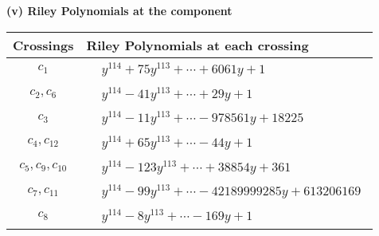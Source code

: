 \documentclass[1p]{elsarticle_modified}
\theoremstyle{definition}
\begin{document}
\flushleft \textbf{(v) Riley Polynomials at the component}\newline \\
\begin{tabular}{m{50pt}|m{274pt}}
Crossings & \hspace{64pt}Riley Polynomials at each crossing \\
\hline $$\begin{aligned}c_{1}\end{aligned}$$&$\begin{aligned}
&y^{114}+75 y^{113}+\cdots+6061 y+1
\end{aligned}$\\
\hline $$\begin{aligned}c_{2},c_{6}\end{aligned}$$&$\begin{aligned}
&y^{114}-41 y^{113}+\cdots+29 y+1
\end{aligned}$\\
\hline $$\begin{aligned}c_{3}\end{aligned}$$&$\begin{aligned}
&y^{114}-11 y^{113}+\cdots-978561 y+18225
\end{aligned}$\\
\hline $$\begin{aligned}c_{4},c_{12}\end{aligned}$$&$\begin{aligned}
&y^{114}+65 y^{113}+\cdots-44 y+1
\end{aligned}$\\
\hline $$\begin{aligned}c_{5},c_{9},c_{10}\end{aligned}$$&$\begin{aligned}
&y^{114}-123 y^{113}+\cdots+38854 y+361
\end{aligned}$\\
\hline $$\begin{aligned}c_{7},c_{11}\end{aligned}$$&$\begin{aligned}
&y^{114}-99 y^{113}+\cdots-42189999285 y+613206169
\end{aligned}$\\
\hline $$\begin{aligned}c_{8}\end{aligned}$$&$\begin{aligned}
&y^{114}-8 y^{113}+\cdots-169 y+1
\end{aligned}$\\
\hline
\end{tabular}\\~\\
\end{document}

